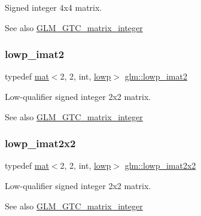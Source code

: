 Signed integer 4x4 matrix. \begin{DoxySeeAlso}{See also}
\mbox{\hyperlink{group__gtc__matrix__integer}{G\+L\+M\+\_\+\+G\+T\+C\+\_\+matrix\+\_\+integer}} 
\end{DoxySeeAlso}
\mbox{\label{group__gtc__matrix__integer_gae4e37c11bd4e1d22eaf128792a7a0030}} 
\subsubsection{\texorpdfstring{lowp\+\_\+imat2}{lowp\_imat2}}
{\footnotesize\ttfamily typedef \mbox{\hyperlink{structglm_1_1mat}{mat}}$<$2, 2, int, \mbox{\hyperlink{namespaceglm_a36ed105b07c7746804d7fdc7cc90ff25ae161af3fc695e696ce3bf69f7332bc2d}{lowp}}$>$ \mbox{\hyperlink{group__gtc__matrix__integer_gae4e37c11bd4e1d22eaf128792a7a0030}{glm\+::lowp\+\_\+imat2}}}

Low-\/qualifier signed integer 2x2 matrix. \begin{DoxySeeAlso}{See also}
\mbox{\hyperlink{group__gtc__matrix__integer}{G\+L\+M\+\_\+\+G\+T\+C\+\_\+matrix\+\_\+integer}} 
\end{DoxySeeAlso}
\mbox{\label{group__gtc__matrix__integer_gab3548c407d85abacc0ee73eeb91169a0}} 
\subsubsection{\texorpdfstring{lowp\+\_\+imat2x2}{lowp\_imat2x2}}
{\footnotesize\ttfamily typedef \mbox{\hyperlink{structglm_1_1mat}{mat}}$<$2, 2, int, \mbox{\hyperlink{namespaceglm_a36ed105b07c7746804d7fdc7cc90ff25ae161af3fc695e696ce3bf69f7332bc2d}{lowp}}$>$ \mbox{\hyperlink{group__gtc__matrix__integer_gab3548c407d85abacc0ee73eeb91169a0}{glm\+::lowp\+\_\+imat2x2}}}

Low-\/qualifier signed integer 2x2 matrix. \begin{DoxySeeAlso}{See also}
\mbox{\hyperlink{group__gtc__matrix__integer}{G\+L\+M\+\_\+\+G\+T\+C\+\_\+matrix\+\_\+integer}} 
\end{DoxySeeAlso}
\mbox{\label{group__gtc__matrix__integer_ga4b3b731b3f8ad88feee31e945c3618ca}} 
